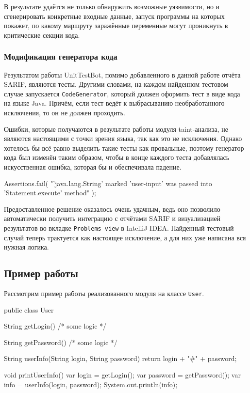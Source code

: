 В результате удаётся не только обнаружить возможные уязвимости, но и сгенерировать конкретные входные данные, запуск программы на которых покажет, по какому маршруту заражённые переменные могут проникнуть в критические секции кода.

\subsubsection{Модификация генератора кода}

Результатом работы UnitTestBot, помимо добавленного в данной работе отчёта SARIF, являются тесты. Другими словами, на каждом найденном тестовом случае запускается \verb|CodeGenerator|, который должен оформить тест в виде кода на языке Java. Причём, если тест ведёт к выбрасыванию необработанного исключения, то он не должен проходить.

Ошибки, которые получаются в результате работы модуля taint-анализа, не являются настоящими с точки зрения языка, так как это не исключения. Однако хотелось бы всё равно выделить такие тесты как провальные, поэтому генератор кода был изменён таким образом, чтобы в конце каждого теста добавлялась искусственная ошибка, которая бы и обеспечивала падение.

\begin{code}
Assertions.fail(
    "'java.lang.String' marked 'user-input'
     was passed into 'Statement.execute' method"
);
\end{code}

Предоставленное решение оказалось очень удачным, ведь оно позволило автоматически получить интеграцию с отчётами SARIF и визуализацией результатов во вкладке \verb|Problems view| в IntelliJ IDEA. Найденный тестовый случай теперь трактуется как настоящее исключение, а для них уже написана вся нужная логика.

\subsection{Пример работы}

Рассмотрим пример работы реализованного модуля на классе \verb|User|. 

\begin{code}
public class User {

    String getLogin() { /* some logic */ }

    String getPassword() { /* some logic */ }

    String userInfo(String login, String password) {
        return login + "#" + password;
    }

    void printUserInfo() {
        var login = getLogin();
        var password = getPassword();
        var info = userInfo(login, password);
        System.out.println(info);
    }
}
\end{code}

